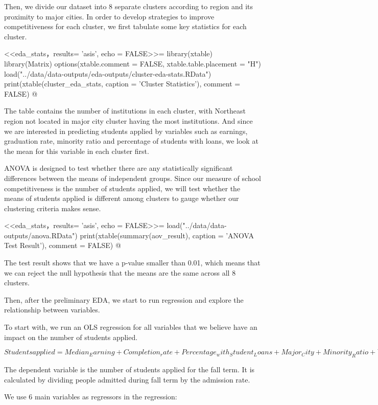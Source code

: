 \documentclass{article}
\begin{document}
Then, we divide our dataset into 8 separate clusters according to region and its proximity to major cities. In order to develop strategies to improve competitiveness for each cluster, we first tabulate some key statistics for each cluster.

<<eda_stats，results= 'asis', echo = FALSE>>=
library(xtable)
library(Matrix)
options(xtable.comment = FALSE,
        xtable.table.placement = "H")
load("../data/data-outputs/eda-outputs/cluster-eda-stats.RData")
print(xtable(cluster_eda_stats, caption = 'Cluster Statistics'), comment = FALSE)
@

The table contains the number of institutions in each cluster, with Northeast region not located in major city cluster having the most institutions. And since we are interested in predicting students applied by variables such as earnings, graduation rate, minority ratio and percentage of students with loans, we look at the mean for this variable in each cluster first.

ANOVA is designed to test whether there are any statistically significant differences between the means of independent groups. Since our measure of school competitiveness is the number of students applied, we will test whether the means of students applied is different among clusters to gauge whether our clustering criteria makes sense.

<<eda_stats，results= 'asis', echo = FALSE>>=
load("../data/data-outputs/anova.RData")
print(xtable(summary(aov_result), caption = 'ANOVA Test Result'), comment = FALSE)
@

The test result shows that we have a p-value smaller than 0.01, which means that we can reject the null hypothesis that the means are the same across all 8 clusters.

Then, after the preliminary EDA, we start to run regression and explore the relationship between variables.

To start with, we run an OLS regression for all variables that we believe have an impact on the number of students applied.

$Students applied = Median_Earning + Completion_rate + Percentage_with_Student_Loans + Major_City + Minority_Ratio + West + Midwest + Northeast$

The dependent variable is the number of students applied for the fall term. It is calculated by dividing people admitted during fall term by the admission rate.

We use 6 main variables as regressors in the regression:
\end{document}
